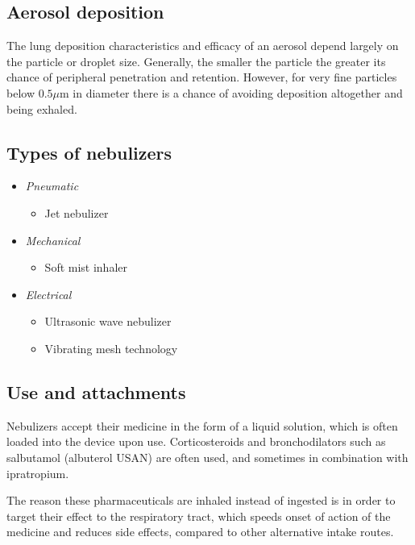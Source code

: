 \documentclass[12pt]{article}
\begin{document}
\subsection{Aerosol deposition}
The lung deposition characteristics and efficacy of an aerosol depend largely on the particle or droplet size. Generally, the smaller the particle the greater its chance of peripheral penetration and retention. However, for very fine particles below $0.5  \mu$m in diameter there is a chance of avoiding deposition altogether and being exhaled.

\subsection{Types of nebulizers}

\begin{itemize}
\item \textsl{Pneumatic}
	\begin{itemize}
	\item Jet nebulizer
	\end{itemize}
\item \textsl{Mechanical}
	\begin{itemize}
	\item Soft mist inhaler
	\end{itemize}
\item \textsl{Electrical}
	\begin{itemize}
	\item Ultrasonic wave nebulizer
	\item Vibrating mesh technology
	\end{itemize}
\end{itemize}

\subsection{Use and attachments}
Nebulizers accept their medicine in the form of a liquid solution, which is often loaded into the device upon use. Corticosteroids and bronchodilators such as salbutamol (albuterol USAN) are often used, and sometimes in combination with ipratropium.
\newline

The reason these pharmaceuticals are inhaled instead of ingested is in order to target their effect to the respiratory tract, which speeds onset of action of the medicine and reduces side effects, compared to other alternative intake routes.
\newline
\end{document}
